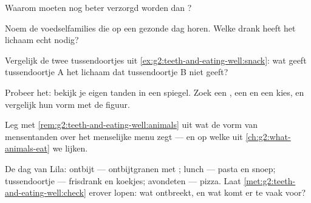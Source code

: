 \begin{exercise}[$\star$]\label{exo:g2:teeth-and-eating-well:5}
Waarom moeten  nog beter verzorgd worden dan ?
\end{exercise}

\begin{exercise}[$\star$]\label{exo:g2:teeth-and-eating-well:6}
Noem de voedselfamilies die op een gezonde dag horen. Welke drank heeft
het lichaam echt nodig?
\end{exercise}

\begin{exercise}[$\star$]\label{exo:g2:teeth-and-eating-well:7}
Vergelijk de twee tussendoortjes uit \cref{ex:g2:teeth-and-eating-well:snack}:
wat geeft tussendoortje A het lichaam dat tussendoortje B niet geeft?
\end{exercise}

\begin{exercise}[$\star$]\label{exo:g2:teeth-and-eating-well:8}
Probeer het: bekijk je eigen tanden in een spiegel. Zoek een ,
een  en een kies, en vergelijk hun vorm met de figuur.
\end{exercise}

\begin{exercise}[$\star\star$]\label{exo:g2:teeth-and-eating-well:9}
Leg met \cref{rem:g2:teeth-and-eating-well:animals} uit wat de vorm van
mensentanden over het menselijke menu zegt --- en op welke  uit
\cref{ch:g2:what-animals-eat} we lijken.
\end{exercise}

\begin{exercise}[$\star\star$]\label{exo:g2:teeth-and-eating-well:10}
De dag van Lila: ontbijt --- ontbijtgranen met ; lunch --- pasta en
snoep; tussendoortje --- frisdrank en koekjes; avondeten --- pizza.
Laat \cref{met:g2:teeth-and-eating-well:check} erover lopen: wat
ontbreekt, en wat komt er te vaak voor?
\end{exercise}
